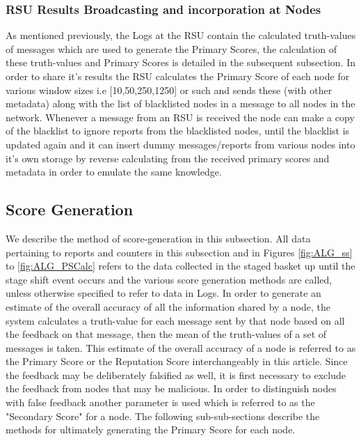 \documentclass[journal]{IEEEtran}
\begin{document}
\subsubsection{RSU Results Broadcasting and incorporation at Nodes}
As mentioned previously, the Logs at the RSU contain the calculated truth-values of messages which are used to generate the Primary Scores, the calculation of these truth-values and Primary Scores is detailed in the subsequent subsection.
In order to share it's results the RSU calculates the Primary Score of each node for various window sizes i.e [10,50,250,1250] or such and sends these (with other metadata) along with the list of blacklisted nodes in a message to all nodes in the network. Whenever a message from an RSU is received the node can make a copy of the blacklist to ignore reports from the blacklisted nodes, until the blacklist is updated again and it can insert dummy messages/reports from various nodes into it's own storage by reverse calculating from the received primary scores and metadata in order to emulate the same knowledge.
\subsection{Score Generation}
\label{sec:PM:ScoreGeneretion}
We describe the method of score-generation in this subsection. All data pertaining to reports and counters in this subsection and in Figures \ref{fig:ALG_ss} to \ref{fig:ALG_PSCalc} refers to the data collected in the staged basket up until the stage shift event occurs and the various score generation methods are called, unless otherwise specified to refer to data in Logs. 
In order to generate an estimate of the overall accuracy of all the information shared by a node, the system calculates a truth-value for each message sent by that node based on all the feedback on that message, then the mean of the truth-values of a set of messages is taken. This estimate of the overall accuracy of a node is referred to as the Primary Score or the Reputation Score interchangeably in this article. Since the feedback may be deliberately falsified as well, it is first necessary to exclude the feedback from nodes that may be malicious. In order to distinguish nodes with false feedback another parameter is used which is referred to as the "Secondary Score" for a node.
The following sub-sub-sections describe the methods for ultimately generating the Primary Score for each node.
\end{document}
